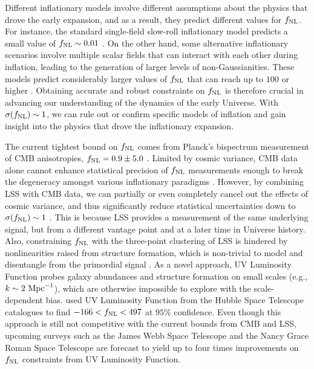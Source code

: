 Different inflationary models involve different assumptions about the physics that drove the early expansion, and as a result, they predict different values for $f_{\rm NL}$. For instance, the standard single-field slow-roll inflationary model predicts a small value of $f_{\rm NL} \sim 0.01$ \citep[see, also,][for a discussion]{2003JHEP...05..013M}. On the other hand, some alternative inflationary scenarios involve multiple scalar fields that can interact with each other during inflation, leading to the generation of larger levels of non-Gaussianities. These models predict considerably larger values of $f_{\rm NL}$ that can reach up to $100$ or higher \citep[see, e.g.,][]{alvarez2014arXiv1412.4671A, de2017next}. Obtaining accurate and robust constraints on $f_{\rm NL}$ is therefore crucial in advancing our understanding of the dynamics of the early Universe. With $\sigma (f_{\rm NL})\sim 1$, we can rule out or confirm specific models of inflation and gain insight into the physics that drove the inflationary expansion.

The current tightest bound on $f_{\rm NL}$ comes from Planck's bispectrum measurement of CMB anisotropies, $f_{\rm NL}=0.9\pm 5.0$ \citep{akrami2019planck}. Limited by cosmic variance, CMB data alone cannot enhance statistical precision of $f_{\rm NL}$ measurements enough to break the degeneracy amongst various inflationary paradigms \citep[see, e.g.,][]{ade2019simons}. However, by combining LSS with CMB data, we can partially or even completely cancel out the effects of cosmic variance, and thus significantly reduce statistical uncertainties down to $\sigma(f_{\rm NL})\sim 1$ \citep[see, e.g.,][]{schmittfull2018PhRvD}. This is because LSS provides a measurement of the same underlying signal, but from a different vantage point and at a later time in Universe history. Also, constraining $f_{\rm NL}$ with the three-point clustering of LSS is hindered by nonlinearities raised from structure formation, which is non-trivial to model and disentangle from the primordial signal \citep{baldauf2011galaxy, baldauf2011primordial}. As a novel approach, UV Luminosity Function probes galaxy abundances and structure formation on small scales (e.g., $k \sim 2~{\rm Mpc}^{-1}$), which are otherwise impossible to explore with the scale-dependent bias. \cite{sabti2021JCAP} used UV Luminosity Function from the Hubble Space Telescope catalogues \citep{bouwens2015ApJ} to find $-166<f_{\rm NL}<497$ at $95\%$ confidence. Even though this approach is still not competitive with the current bounds from CMB and LSS, upcoming surveys such as the James Webb Space Telescope and the Nancy Grace Roman Space Telescope are forecast to yield up to four times improvements on $
f_{\rm NL}$ constraints from UV Luminosity Function. 


